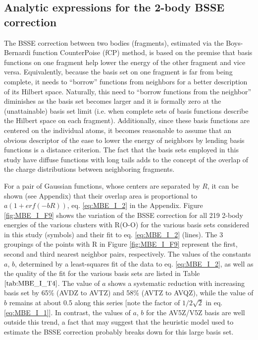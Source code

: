 \documentclass[11pt, proquest]{uwthesis}[2020/02/24]
\newcommand{\textapprox}{\raisebox{0.5ex}{\texttildelow}}
\begin{document}
\subsection{Analytic expressions for the 2-body BSSE correction}

\par The BSSE correction between two bodies (fragments), estimated via the Boys-Bernardi function CounterPoise (fCP) method,\autocite{boys_calculation_1970} is based on the premise that basis functions on one fragment help lower the energy of the other fragment and vice versa. Equivalently, because the basis set on one fragment is far from being complete, it needs to “borrow” functions from neighbors for a better description of its Hilbert space. Naturally, this need to “borrow functions from the neighbor” diminishes as the basis set becomes larger and it is formally zero at the (unattainable) basis set limit (i.e. when complete sets of basis functions describe the Hilbert space on each fragment). Additionally, since these basis functions are centered on the individual atoms, it becomes reasonable to assume that an obvious descriptor of the ease to lower the energy of neighbors by lending basis functions is a distance criterion. The fact that the basis sets employed in this study have diffuse functions with long tails adds to the concept of the overlap of the charge distributions between neighboring fragments.
\par For a pair of Gaussian functions, whose centers are separated by $R$, it can be shown (see Appendix) that their overlap area is proportional to $a(1+erf(-bR))$, eq. \eqref{eq:MBE_I_2} in the Appendix. Figure \ref{fig:MBE_I_F9} shows the variation of the BSSE correction for all 219 2-body energies of the various clusters with R(O-O) for the various basis sets considered in this study (symbols) and their fit to eq. \eqref{eq:MBE_I_2} (lines). The 3 groupings of the points with R in Figure \ref{fig:MBE_I_F9} represent the first, second and third nearest neighbor pairs, respectively. The values of the constants $a$, $b$, determined by a least-squares fit of the data to eq. \eqref{eq:MBE_I_2}, as well as the quality of the fit for the various basis sets are listed in Table $\ref{tab:MBE_I_T4}$. The value of $a$ shows a systematic reduction with increasing basis set by \textapprox65\% (AVDZ to AVTZ) and \textapprox58\% (AVTZ to AVQZ), while the value of $b$ remains at about 0.5 along this series [note the factor of $1/2\sqrt{2}$ in eq. \eqref{eq:MBE_I_1}]. In contrast, the values of $a$, $b$ for the AV5Z/V5Z basis are well outside this trend, a fact that may suggest that the heuristic model used to estimate the BSSE correction probably breaks down for this large basis set.
\end{document}
